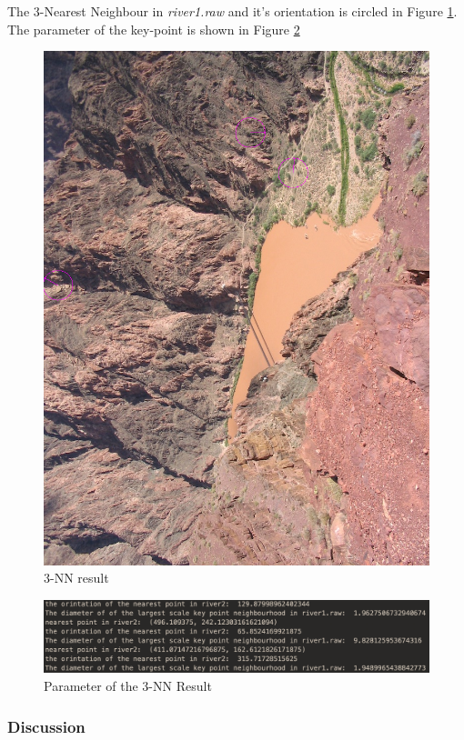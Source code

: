 \documentclass[11pt]{article}
\begin{document}
The 3-Nearest Neighbour in {\it river1.raw} and it's orientation is circled in Figure \ref{3nn_river2}. The parameter of the key-point is shown in Figure \ref{3nnpara}
\begin{figure}[!htp]
	\centering
	\includegraphics[scale=0.2]{3nn_river2.png}
	\caption{ 3-NN result}
	\label{3nn_river2}
	\end{figure}
	
\begin{figure}[!htp]
	\centering
	\includegraphics[scale=0.3]{3nnpara.png}
	\caption{ Parameter of the 3-NN Result}
	\label{3nnpara}
	\end{figure}	
	
	
\subsubsection{Discussion}
\end{document}
